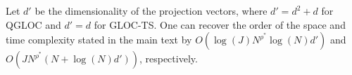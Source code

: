 Let $d'$ be the dimensionality of the projection vectors, where $d'=d^2+d$ for QGLOC and $d'=d$ for GLOC-TS.
One can recover the order of the space and time complexity stated in the main text by $O(\log(J) N^{\rho^*} \log (N) d')$ and $O( J N^{\rho^*} (N + \log (N)d') )$, respectively.


\vspace{-5pt}
